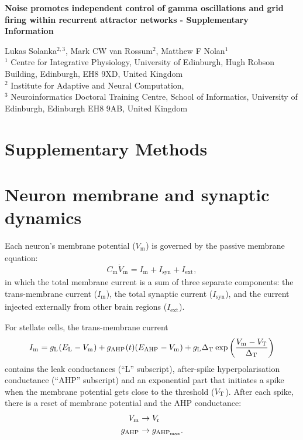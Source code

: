\documentclass[a4paper,12pt]{article}
\newcommand{\ssc}[3]{\ensuremath{#1_{\text{#2}_{\text{#3}}}}}
\newcommand{\Cm}       {\ssc{C}      {m}     {}}
\newcommand{\Vm}       {\ssc{V}      {m}     {}}
\newcommand{\Imem}     {\ssc{I}      {m}     {}}
\newcommand{\Isyn}     {\ssc{I}      {syn}   {}}
\newcommand{\Iext}     {\ssc{I}      {ext}   {}}
\newcommand{\gL}       {\ssc{g}      {\scriptsize{L}}  {}}
\newcommand{\EL}       {\ssc{E}      {\scriptsize{L}}  {}}
\newcommand{\gAHP}     {\ssc{g}      {\scriptsize{AHP}}{}}
\newcommand{\gAHPmax}  {\ssc{g}      {\scriptsize{AHP}}{max}}
\newcommand{\EAHP}     {\ssc{E}      {\scriptsize{AHP}}{}}
\newcommand{\VT}       {\ssc{V}      {\scriptsize{T}}  {}}
\newcommand{\Vr}       {\ssc{V}      {r}     {}}
\newcommand{\deltaT}   {\ssc{\Delta} {\scriptsize{T}}{}}
\newcommand{\dVm}    {\ssc{\dot{V}}{m}   {}}
\begin{document}
\renewcommand\linenumberfont{\normalfont\small}
\resetlinenumber[724]
\linenumbers

\begin{center}
{\bfseries
Noise promotes independent control of gamma oscillations and grid firing within
recurrent attractor networks - Supplementary Information
}
\end{center}

\begin{flushleft}
Lukas Solanka$^{2,3}$,
Mark CW van Rossum$^{2}$,
Matthew F Nolan$^{1}$
\\
\vspace{2em}
$^1$
Centre for Integrative Physiology,
University of Edinburgh,
Hugh Robson Building,
Edinburgh, EH8 9XD,
United Kingdom
\\
$^2$
Institute for Adaptive and Neural Computation,
\\
$^3$
Neuroinformatics Doctoral Training Centre,
School of Informatics,
University of Edinburgh,
Edinburgh EH8 9AB,
United Kingdom
\end{flushleft}

\listoftodos

\clearpage


\section*{Supplementary Methods} \label{methods}

\section{Neuron membrane and synaptic dynamics} \label{nrn_Vm_syn}

Each neuron's membrane potential ($\Vm$) is governed by the passive membrane equation:
\begin{equation}
    \Cm \dVm   = \Imem + \Isyn + \Iext,
    \label{eq:Vm}
\end{equation}
in which the total membrane current is a sum of three separate components: the
trans-membrane current ($\Imem$), the total synaptic current ($\Isyn$), and the
current injected externally from other brain regions ($\Iext$). 

For stellate cells, the trans-membrane current
\begin{equation}
    \Imem = \gL(\EL-\Vm) + \gAHP(t)(\EAHP - \Vm) + \gL \deltaT \exp\left(\frac{\Vm - \VT}{\deltaT}\right)
    \label{eq:Imem_st}
\end{equation}
contains the leak conductances (``L'' subscript), after-spike hyperpolarisation
conductance (``AHP'' subscript) and an exponential part that initiates a spike
when the membrane potential gets close to the threshold ($\VT$).  After each
spike, there is a reset of membrane potential and the AHP conductance:
\begin{align}
    \Vm   & \rightarrow \Vr       \notag \\
    \gAHP & \rightarrow \gAHPmax.
    \label{eq:afterspike_st}
\end{align}
\end{document}
